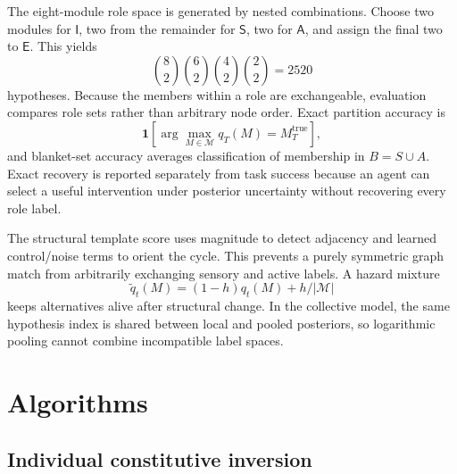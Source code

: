 \documentclass[11pt,a4paper]{article}
\numberwithin{equation}{section}
\newcommand{\Irole}{\mathsf{I}}
\newcommand{\Srole}{\mathsf{S}}
\newcommand{\Arole}{\mathsf{A}}
\newcommand{\Erole}{\mathsf{E}}
\newcommand{\Mset}{\mathcal{M}}
\begin{document}
The eight-module role space is generated by nested combinations. Choose two
modules for $\Irole$, two from the remainder for $\Srole$, two for $\Arole$,
and assign the final two to $\Erole$. This yields
\begin{equation}
 \binom{8}{2}\binom{6}{2}\binom{4}{2}\binom{2}{2}=2520
 \label{eq:enumeration}
\end{equation}
hypotheses. Because the members within a role are exchangeable, evaluation
compares role sets rather than arbitrary node order. Exact partition accuracy
is
\begin{equation}
 \mathbf1\!\left[\arg\max_{M\in\Mset}q_T(M)=M_T^{\mathrm{true}}\right],
 \label{eq:exact-partition}
\end{equation}
and blanket-set accuracy averages classification of membership in
$B=S\cup A$. Exact recovery is reported separately from task success because
an agent can select a useful intervention under posterior uncertainty without
recovering every role label.

The structural template score uses magnitude to detect adjacency and learned
control/noise terms to orient the cycle. This prevents a purely symmetric
graph match from arbitrarily exchanging sensory and active labels. A hazard
mixture
\begin{equation}
 \widetilde q_t(M)=(1-h)q_t(M)+h/|\Mset|
 \label{eq:hazard}
\end{equation}
keeps alternatives alive after structural change. In the collective model,
the same hypothesis index is shared between local and pooled posteriors, so
logarithmic pooling cannot combine incompatible label spaces.

\section{Algorithms}

\subsection{Individual constitutive inversion}
\end{document}
